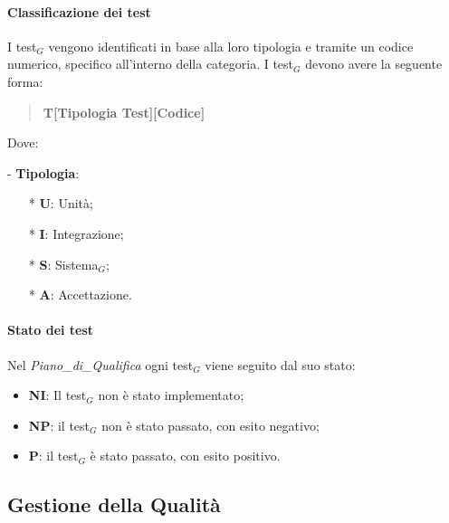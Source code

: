 \documentclass[10pt]{article}
\begin{document}
\begin{justify}
    \paragraph{Classificazione dei test}
    I test$_G$ vengono identificati in base alla loro tipologia e tramite un codice numerico, specifico all'interno della categoria. I test$_G$ devono avere la seguente forma:
    \begin{quote}
    \textbf{T[Tipologia Test][Codice]}\\
    \end{quote}
    Dove:
    \item [-] \textbf{Tipologia}:
    \begin{itemize}
        \item [*] \textbf{U}: Unità;
        \item [*] \textbf{I}: Integrazione;
        \item [*] \textbf{S}: Sistema$_G$;
        \item [*] \textbf{A}: Accettazione.
    \end{itemize}

    \paragraph{Stato dei test}
    Nel \textit{Piano\_di\_Qualifica} ogni test$_G$ viene seguito dal suo stato:
    \begin{itemize}
    \item \textbf{NI}: Il test$_G$ non è stato implementato;
    \item \textbf{NP}: il test$_G$ non è stato passato, con esito negativo;
    \item \textbf{P}: il test$_G$ è stato passato, con esito positivo.
    \end{itemize}

\subsection{Gestione della Qualità}


\end{justify}
\end{document}
